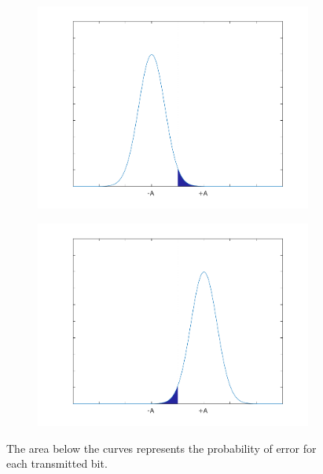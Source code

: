 \begin{refsection}
\begin{figure}[H]
	\centering
	\begin{subfigure}{.5\textwidth}
		\centering
		\includegraphics[clip, trim=1cm 0cm 1cm 0cm,width=\textwidth]{./sdf/m_qam_system/figures/gaussian_error_2.pdf}
	\end{subfigure}%
	\begin{subfigure}{.5\textwidth}
		\centering
		\includegraphics[clip, trim=1cm 0cm 1cm 0cm,width=\textwidth]{./sdf/m_qam_system/figures/gaussian_error.pdf}
	\end{subfigure}
	\caption{The area below the curves represents the probability of error for each transmitted bit.}
	\label{fig:gausserr}
\end{figure}


\end{refsection}
